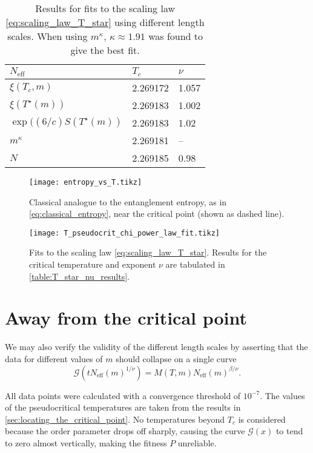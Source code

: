 \begin{table}[]
\centering
\begin{tabular}{@{}lll@{}} \toprule
$N_{\text{eff}}$                  & $T_c$   & $\nu$   \\ \midrule
$\xi(T_c, m)$                     & 2.269172  & 1.057         \\
$\xi(T^{\star}(m))$               & 2.269183   & 1.002        \\
$\exp((6/c)S(T^{\star}(m))$       & 2.269183   & 1.02       \\
$m^{\kappa}$                      & 2.269181  & --        \\
$N$                               & 2.269185  & 0.98          \\ \bottomrule
\end{tabular}
  \caption{Results for fits to the scaling law \autoref{eq:scaling_law_T_star} using different length scales.
  When using $m^{\kappa}$, $\kappa \approx 1.91$ was found to give the best fit.} \label{table:T_star_nu_results}
\end{table}

\begin{figure}
  \texttt{[image: entropy\_vs\_T.tikz]}
  \caption{Classical analogue to the entanglement entropy, as in \autoref{eq:classical_entropy},
  near the critical point (shown as dashed line).}\label{fig:entropy_vs_T}
\end{figure}

\begin{figure}
  \texttt{[image: T\_pseudocrit\_chi\_power\_law\_fit.tikz]}
  \caption{Fits to the scaling law \autoref{eq:scaling_law_T_star}.
  Results for the critical temperature and exponent $\nu$ are tabulated in
  \autoref{table:T_star_nu_results}.}\label{fig:T_pseudocrit_chi_power_law_fit}
\end{figure}

\section{Away from the critical point}

We may also verify the validity of the different length scales by asserting that the data for different values of $m$
should collapse on a single curve
\begin{equation}
  \mathcal{G}(t N_{\text{eff}}(m)^{1/\nu}) = M(T, m) N_{\text{eff}}(m)^{\beta/\nu}.
\end{equation}

All data points were calculated with a convergence threshold of $10^{-7}$.
The values of the pseudocritical temperatures are taken from the results in \autoref{sec:locating_the_critical_point}.
No temperatures beyond $T_c$ is considered because the order parameter drops off sharply,
causing the curve $\mathcal{G}(x)$ to tend to zero almost vertically, making the fitness $P$ unreliable.

